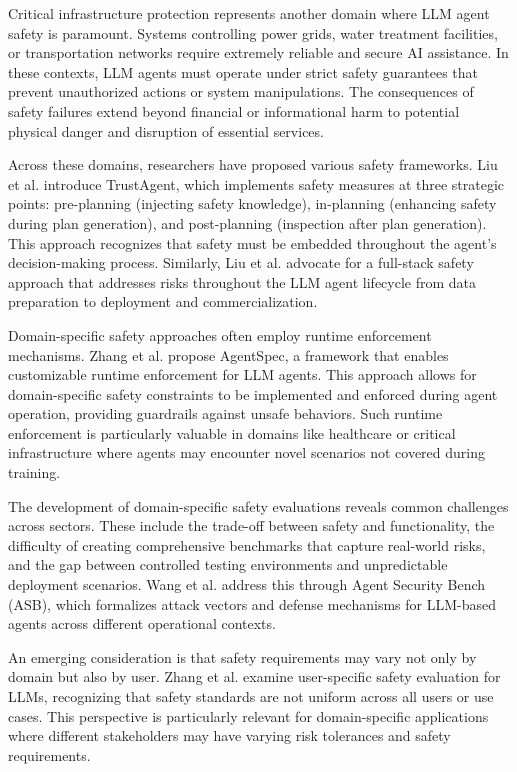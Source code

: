 \documentclass[conference]{IEEEtran}
\begin{document}
Critical infrastructure protection represents another domain where LLM agent safety is paramount. Systems controlling power grids, water treatment facilities, or transportation networks require extremely reliable and secure AI assistance. In these contexts, LLM agents must operate under strict safety guarantees that prevent unauthorized actions or system manipulations. The consequences of safety failures extend beyond financial or informational harm to potential physical danger and disruption of essential services.

Across these domains, researchers have proposed various safety frameworks. Liu et al. \cite{2402.01586} introduce TrustAgent, which implements safety measures at three strategic points: pre-planning (injecting safety knowledge), in-planning (enhancing safety during plan generation), and post-planning (inspection after plan generation). This approach recognizes that safety must be embedded throughout the agent's decision-making process. Similarly, Liu et al. \cite{2504.15585} advocate for a full-stack safety approach that addresses risks throughout the LLM agent lifecycle from data preparation to deployment and commercialization.

Domain-specific safety approaches often employ runtime enforcement mechanisms. Zhang et al. \cite{2503.18666} propose AgentSpec, a framework that enables customizable runtime enforcement for LLM agents. This approach allows for domain-specific safety constraints to be implemented and enforced during agent operation, providing guardrails against unsafe behaviors. Such runtime enforcement is particularly valuable in domains like healthcare or critical infrastructure where agents may encounter novel scenarios not covered during training.

The development of domain-specific safety evaluations reveals common challenges across sectors. These include the trade-off between safety and functionality, the difficulty of creating comprehensive benchmarks that capture real-world risks, and the gap between controlled testing environments and unpredictable deployment scenarios. Wang et al. \cite{2410.02644} address this through Agent Security Bench (ASB), which formalizes attack vectors and defense mechanisms for LLM-based agents across different operational contexts.

An emerging consideration is that safety requirements may vary not only by domain but also by user. Zhang et al. \cite{2502.15086} examine user-specific safety evaluation for LLMs, recognizing that safety standards are not uniform across all users or use cases. This perspective is particularly relevant for domain-specific applications where different stakeholders may have varying risk tolerances and safety requirements.
\end{document}
